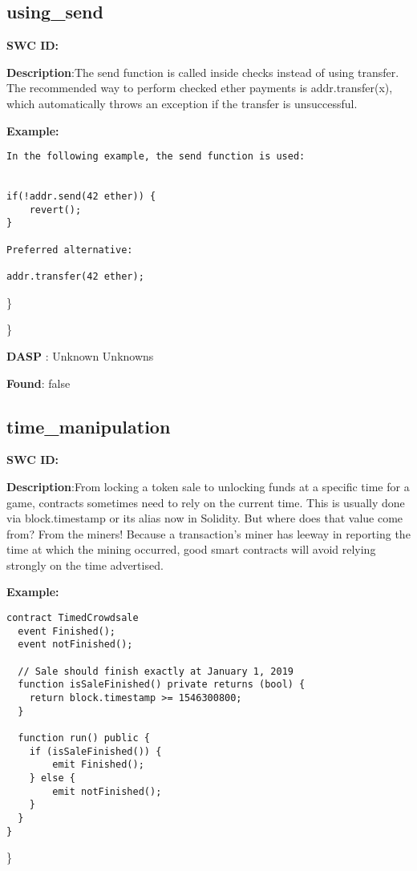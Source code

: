 \documentclass{article}
\begin{document}
\subsection{using\_send} 
\textbf{SWC \textunderscore ID:} 

\textbf{Description}:The send function is called inside checks instead of using transfer. The recommended way to perform checked ether payments is addr.transfer(x), which automatically throws an exception if the transfer is unsuccessful.


\textbf{Example:} 
\begin{verbatim}
In the following example, the send function is used:


if(!addr.send(42 ether)) {
    revert();
}

Preferred alternative:

addr.transfer(42 ether);

\end{verbatim}\} 

\} 

\textbf{DASP} : Unknown Unknowns

\textbf{Found}: false

\subsection{time\_manipulation} 
\textbf{SWC \textunderscore ID:} 

\textbf{Description}:From locking a token sale to unlocking funds at a specific time for a game, contracts sometimes need to rely on the current time. This is usually done via block.timestamp or its alias now in Solidity. But where does that value come from? From the miners! Because a transaction's miner has leeway in reporting the time at which the mining occurred, good smart contracts will avoid relying strongly on the time advertised.


\textbf{Example:} 
\begin{verbatim}
contract TimedCrowdsale
  event Finished();
  event notFinished();

  // Sale should finish exactly at January 1, 2019
  function isSaleFinished() private returns (bool) {
    return block.timestamp >= 1546300800;
  }

  function run() public {
    if (isSaleFinished()) {
        emit Finished();
    } else {
        emit notFinished();
    }
  }
}

\end{verbatim}\} 
\end{document}
